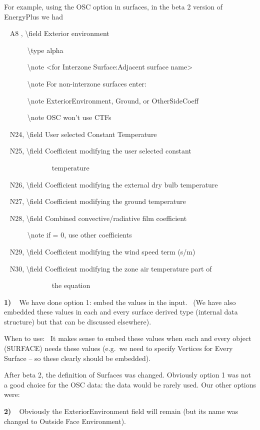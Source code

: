 For example, using the OSC option in surfaces, in the beta 2 version of EnergyPlus we had

~ A8 , \textbackslash{}field Exterior environment

~~~~~~ \textbackslash{}type alpha

~~~~~~ \textbackslash{}note \textless{}for Interzone Surface:Adjacent surface name\textgreater{}

~~~~~~ \textbackslash{}note For non-interzone surfaces enter:

~~~~~~ \textbackslash{}note ExteriorEnvironment, Ground, or OtherSideCoeff

~~~~~~ \textbackslash{}note OSC won't use CTFs

~ N24, \textbackslash{}field User selected Constant Temperature

~ N25, \textbackslash{}field Coefficient modifying the user selected constant

~~~~~~~~~~~~~ temperature

~ N26, \textbackslash{}field Coefficient modifying the external dry bulb temperature

~ N27, \textbackslash{}field Coefficient modifying the ground temperature

~ N28, \textbackslash{}field Combined convective/radiative film coefficient

~~~~~~ \textbackslash{}note if = 0, use other coefficients

~ N29, \textbackslash{}field Coefficient modifying the wind speed term (s/m)

~ N30, \textbackslash{}field Coefficient modifying the zone air temperature part of

~~~~~~~~~~~~~ the equation

\textbf{1)~~}We have done option 1: embed the values in the input.~ (We have also embedded these values in each and every surface derived type (internal data structure) but that can be discussed elsewhere).

When to use:~ It makes sense to embed these values when each and every object (SURFACE) needs these values (e.g.~we need to specify Vertices for Every Surface -- so these clearly should be embedded).

After beta 2, the definition of Surfaces was changed. Obviously option 1 was not a good choice for the OSC data: the data would be rarely used. Our other options were:

\textbf{2)~~}Obviously the ExteriorEnvironment field will remain (but its name was changed to Outside Face Environment).

